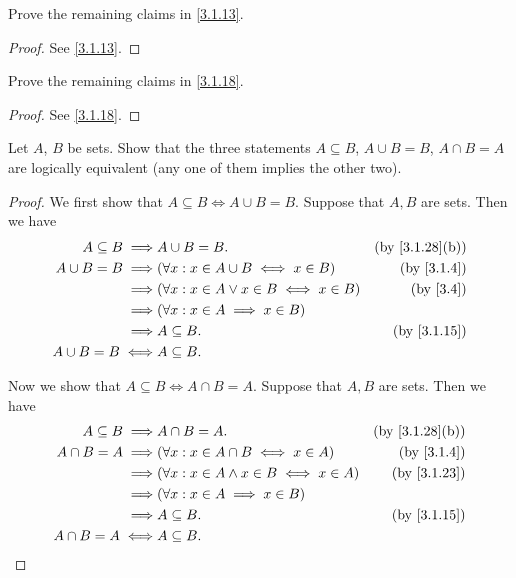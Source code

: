 \begin{exercise}\label{ex 3.1.3}
  Prove the remaining claims in \cref{3.1.13}.
\end{exercise}

\begin{proof}
  See \cref{3.1.13}.
\end{proof}

\begin{exercise}\label{ex 3.1.4}
  Prove the remaining claims in \cref{3.1.18}.
\end{exercise}

\begin{proof}
  See \cref{3.1.18}.
\end{proof}

\begin{exercise}\label{ex 3.1.5}
  Let \(A\), \(B\) be sets.
  Show that the three statements \(A \subseteq B\), \(A \cup B = B\), \(A \cap B = A\) are logically equivalent (any one of them implies the other two).
\end{exercise}

\begin{proof}
  We first show that \(A \subseteq B \iff A \cup B = B\).
  Suppose that \(A, B\) are sets.
  Then we have
  \begin{align*}
    A \subseteq B \implies & A \cup B = B.                                   & \text{(by \cref{3.1.28}(b))} \\
    A \cup B = B \implies  & (\forall x : x \in A \cup B \iff x \in B)       & \text{(by \cref{3.1.4})}     \\
    \implies               & (\forall x : x \in A \lor x \in B \iff x \in B) & \text{(by \cref{3.4})}       \\
    \implies               & (\forall x : x \in A \implies x \in B)                                         \\
    \implies               & A \subseteq B.                                  & \text{(by \cref{3.1.15})}    \\
    A \cup B = B \iff      & A \subseteq B.
  \end{align*}

  Now we show that \(A \subseteq B \iff A \cap B = A\).
  Suppose that \(A, B\) are sets.
  Then we have
  \begin{align*}
    A \subseteq B \implies & A \cap B = A.                                    & \text{(by \cref{3.1.28}(b))} \\
    A \cap B = A \implies  & (\forall x : x \in A \cap B \iff x \in A)        & \text{(by \cref{3.1.4})}     \\
    \implies               & (\forall x : x \in A \land x \in B \iff x \in A) & \text{(by \cref{3.1.23})}    \\
    \implies               & (\forall x : x \in A \implies x \in B)                                          \\
    \implies               & A \subseteq B.                                   & \text{(by \cref{3.1.15})}    \\
    A \cap B = A \iff      & A \subseteq B.
  \end{align*}
\end{proof}

